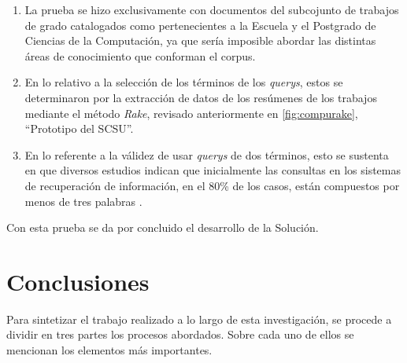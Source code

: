 \documentclass[
  12pt,
  openany]{book}
\begin{document}
\begin{enumerate}
\def\labelenumi{\arabic{enumi}.}
\item
  La prueba se hizo exclusivamente con documentos del subcojunto de trabajos de grado catalogados como pertenecientes a la Escuela y el Postgrado de Ciencias de la Computación, ya que sería imposible abordar las distintas áreas de conocimiento que conforman el corpus.
\item
  En lo relativo a la selección de los términos de los \emph{querys}, estos se determinaron por la extracción de datos de los resúmenes de los trabajos mediante el método \emph{Rake}, revisado anteriormente en \ref{fig:compurake}, ``Prototipo del SCSU''.
\item
  En lo referente a la válidez de usar \emph{querys} de dos términos, esto se sustenta en que diversos estudios indican que inicialmente las consultas en los sistemas de recuperación de información, en el 80\% de los casos, están compuestos por menos de tres palabras \citep{clarke2000}.
\end{enumerate}

Con esta prueba se da por concluido el desarrollo de la Solución.

\hypertarget{conclusiones}{%
\chapter{Conclusiones}\label{conclusiones}}

Para sintetizar el trabajo realizado a lo largo de esta investigación, se procede a dividir en tres partes los procesos abordados. Sobre cada uno de ellos se mencionan los elementos más importantes.
\end{document}
